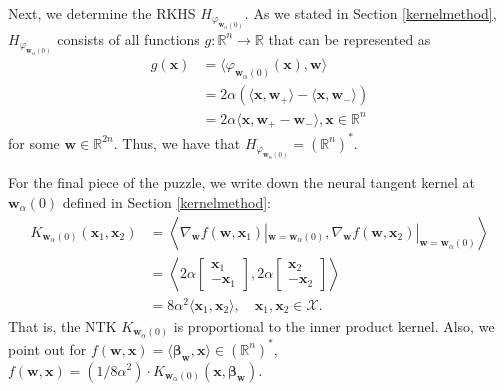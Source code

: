 \documentclass{article}
\begin{document}
Next, we determine the RKHS $H_{\varphi_{\boldsymbol{w}_{\alpha}(0)}}$. As we stated in Section \ref{kernelmethod}, $H_{\varphi_{\boldsymbol{w}_{\alpha}(0)}}$ consists of all functions $g: \mathbb{R}^n \rightarrow \mathbb{R}$ that can be represented as 
\begin{align*}
    g(\boldsymbol{x}) &= \langle \varphi_{\boldsymbol{w}_{\alpha}(0)}(\boldsymbol{x}), \boldsymbol{w} \rangle\\
    &= 2\alpha (\langle \boldsymbol{x}, \boldsymbol{w}_+ \rangle  - \langle \boldsymbol{x}, \boldsymbol{w}_-\rangle)\\
    &= 2\alpha \langle \boldsymbol{x}, \boldsymbol{w}_+ - \boldsymbol{w}_- \rangle, \boldsymbol{x} \in \mathbb{R}^n
\end{align*}
for some $\boldsymbol{w} \in \mathbb{R}^{2n}$. Thus, we have that $H_{\varphi_{\boldsymbol{w}_{\alpha}(0)}} = (\mathbb{R}^n)^*$.

For the final piece of the puzzle, we write down the neural tangent kernel at $\boldsymbol{w}_{\alpha}(0)$ defined in Section \ref{kernelmethod}:
\begin{align*}
K_{\boldsymbol{w}_{\alpha}(0)}(\boldsymbol{x}_1, \boldsymbol{x}_2) &= \left\langle \nabla_{\boldsymbol{w}}f(\boldsymbol{w}, \boldsymbol{x}_1)|_{\boldsymbol{w} = \boldsymbol{w}_{\alpha}(0)}, \nabla_{\boldsymbol{w}}f(\boldsymbol{w}, \boldsymbol{x}_2)|_{\boldsymbol{w} = \boldsymbol{w}_{\alpha}(0)} \right\rangle\\
&= \left\langle 2\alpha 
    \begin{bmatrix}
        \boldsymbol{x}_1\\
        -\boldsymbol{x}_1
    \end{bmatrix}, 2\alpha 
    \begin{bmatrix}
        \boldsymbol{x}_2\\
        -\boldsymbol{x}_2
    \end{bmatrix} \right\rangle\\
&= 8\alpha^2 \langle \boldsymbol{x}_1, \boldsymbol{x}_2 \rangle, \quad \boldsymbol{x}_1, \boldsymbol{x}_2 \in \mathcal{X}.
\end{align*}
That is, the NTK $K_{\boldsymbol{w}_{\alpha}(0)}$ is proportional to the inner product kernel. Also, we point out for $f(\boldsymbol{w}, \boldsymbol{x}) = \langle \boldsymbol{\beta}_{\boldsymbol{w}}, \boldsymbol{x} \rangle \in (\mathbb{R}^n)^*$, $f(\boldsymbol{w}, \boldsymbol{x}) = (1/8\alpha^2)\cdot K_{\boldsymbol{w}_{\alpha}(0)}(\boldsymbol{x},\boldsymbol{\beta}_{\boldsymbol{w}})$.
\end{document}
